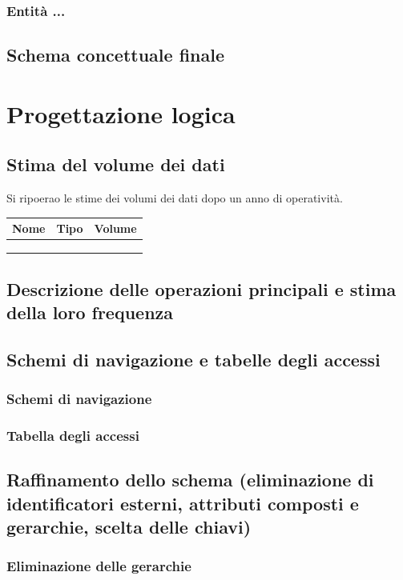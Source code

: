 \documentclass[a4paper,12pt]{report}
\begin{document}
	\subsection{Entità ...}
	\section{Schema concettuale finale}
	\chapter{Progettazione logica}
	\section{Stima del volume dei dati}
	\par Si ripoerao le stime dei volumi dei dati dopo un anno di operatività.
	\begin{table}
	\centering
	\begin{tabular}{|l|l|l|}
		\hline
		Nome & Tipo & Volume \\
		\hline
		     &      &        \\
		\hline
		     &      &        \\
		\hline
		     &      &        \\
		\hline
	\end{tabular}
	\end{table}
	\section{Descrizione delle operazioni principali e stima della loro frequenza}
	\section{Schemi di navigazione e tabelle degli accessi}
	\subsection{Schemi di navigazione}
	\subsection{Tabella degli accessi}
	\section{Raffinamento dello schema (eliminazione di identificatori esterni, attributi composti e gerarchie, scelta delle chiavi)}
	\subsection{Eliminazione delle gerarchie}
\end{document}

